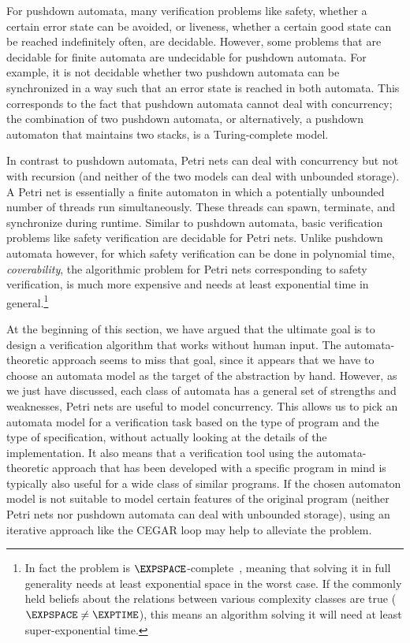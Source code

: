 \documentclass[../../diss.tex]{subfiles}
\begin{document}
For pushdown automata, many verification problems like safety, \ie whether a certain error state can be avoided, or liveness, \ie whether a certain good state can be reached indefinitely often, are decidable.
However, some problems that are decidable for finite automata are undecidable for pushdown automata.
For example, it is not decidable whether two pushdown automata can be synchronized in a way such that an error state is reached in both automata.
This corresponds to the fact that pushdown automata cannot deal with concurrency; the combination of two pushdown automata, or alternatively, a pushdown automaton that maintains two stacks, is a Turing-complete model.

In contrast to pushdown automata, Petri nets can deal with concurrency but not with recursion (and neither of the two models can deal with unbounded storage).
A Petri net is essentially a finite automaton in which a potentially unbounded number of threads run simultaneously.
These threads can spawn, terminate, and synchronize during runtime.
Similar to pushdown automata, basic verification problems like safety verification are decidable for Petri nets.
Unlike pushdown automata however, for which safety verification can be done in polynomial time, \emph{coverability}, the algorithmic problem for Petri nets corresponding to safety verification, is much more expensive and needs at least exponential time in general.\footnote{%
In fact the problem is $\EXPSPACE$-complete~\cite{Lipton76}, meaning that solving it in full generality needs at least exponential space in the worst case.
If the commonly held beliefs about the relations between various complexity classes are true ($\EXPSPACE \neq \EXPTIME$), this means an algorithm solving it will need at least super-exponential time.%
}%

At the beginning of this section, we have argued that the ultimate goal is to design a verification algorithm that works without human input.
The automata-theoretic approach seems to miss that goal, since it appears that we have to choose an automata model as the target of the abstraction by hand.
However, as we just have discussed, each class of automata has a general set of strengths and weaknesses, \eg Petri nets are useful to model concurrency.
This allows us to pick an automata model for a verification task based on the type of program and the type of specification, without actually looking at the details of the implementation.
It also means that a verification tool using the automata-theoretic approach that has been developed with a specific program in mind is typically also useful for a wide class of similar programs.
If the chosen automaton model is not suitable to model certain features of the original program (\eg neither Petri nets nor pushdown automata can deal with unbounded storage), using an iterative approach like the CEGAR loop may help to alleviate the problem.
\end{document}
